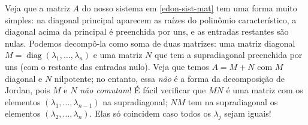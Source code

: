 \documentclass[12pt,a4paper,oneside]{memoir}
\DeclareMathOperator{\diag}{diag}
\begin{document}
Veja que a matriz $A$ do nosso sistema em \eqref{edon-sist-mat} tem uma forma muito simples: na diagonal principal aparecem as raízes do polinômio característico, a diagonal acima da principal é preenchida por uns, e as entradas restantes são nulas.  Podemos decompô-la como soma de duas matrizes: uma matriz diagonal $M = \diag(\lambda_1, \ldots, \lambda_n)$ e uma matriz $N$ que tem a supradiagonal preenchida por uns (com o restante das entradas nulo).  Veja que temos $A = M + N$ com $M$ diagonal e $N$ nilpotente; no entanto, essa \emph{não} é a forma da decomposição de Jordan, pois $M$ e $N$ \emph{não comutam}!  É fácil verificar que $MN$ é uma matriz com os elementos $(\lambda_1, \ldots, \lambda_{n-1})$ na supradiagonal; $NM$ tem na supradiagonal os elementos $(\lambda_2, \ldots, \lambda_n)$.  Elas só coincidem caso todos os $\lambda_j$ sejam iguais!

\end{document}
